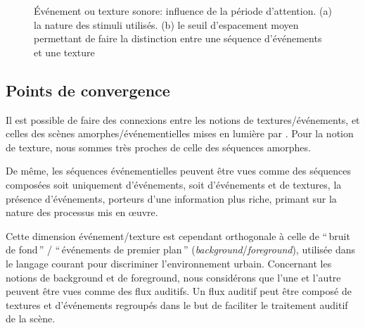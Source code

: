 \begin{figure}[bth]
        \myfloatalign
        \caption[Événement ou texture sonore: influence de la période d'attention]{Événement ou texture sonore: influence de la période d'attention. (a) la nature des stimuli utilisés. (b) le seuil d'espacement moyen permettant de faire la distinction entre une séquence d'événements et une texture}\label{fig:xptexture}
\end{figure}


\subsection{Points de convergence}


Il est possible de faire des connexions entre les notions de textures/événements, et celles des scènes amorphes/événementielles mises en lumière par \citep{maffiolo_caracterisation_1999}. Pour la notion de texture, nous sommes très proches de celle des séquences amorphes.

De même, les séquences événementielles peuvent être vues comme des séquences composées soit uniquement d'événements, soit d'événements et de textures, la présence d'événements, porteurs d'une information plus riche, primant sur la nature des processus mis en œuvre. 

Cette dimension événement/texture est cependant orthogonale à celle de ``\,bruit de fond\,'' / ``\,événements de premier plan\,'' (\emph{background}/\emph{foreground}), utilisée dans le langage courant pour discriminer l’environnement urbain. Concernant les notions de background et de foreground, nous considérons que l'une et l'autre peuvent être vues comme des flux auditifs. Un flux auditif peut être composé de textures et d’événements regroupés dans le but de faciliter le traitement auditif de la scène. 

